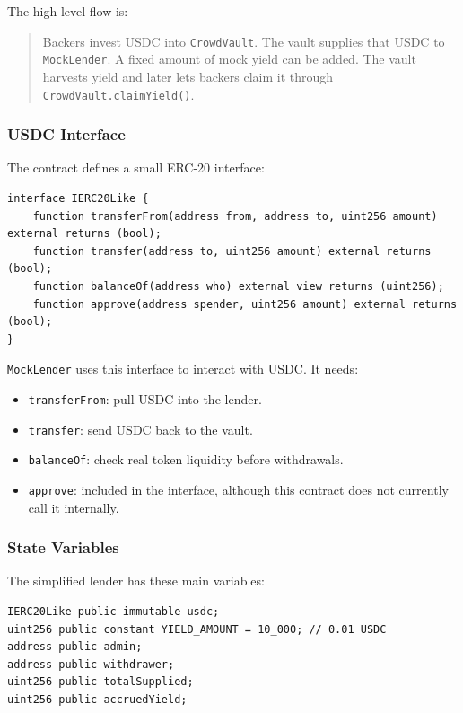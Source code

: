 \documentclass[11pt,a4paper]{article}
\begin{document}
The high-level flow is:

\begin{quote}
Backers invest USDC into \texttt{CrowdVault}. The vault supplies that USDC to \texttt{MockLender}. A fixed amount of mock yield can be added. The vault harvests yield and later lets backers claim it through \texttt{CrowdVault.claimYield()}.
\end{quote}

\subsubsection{USDC Interface}

The contract defines a small ERC-20 interface:

\begin{lstlisting}
interface IERC20Like {
    function transferFrom(address from, address to, uint256 amount) external returns (bool);
    function transfer(address to, uint256 amount) external returns (bool);
    function balanceOf(address who) external view returns (uint256);
    function approve(address spender, uint256 amount) external returns (bool);
}
\end{lstlisting}

\texttt{MockLender} uses this interface to interact with USDC. It needs:

\begin{itemize}
  \item \texttt{transferFrom}: pull USDC into the lender.
  \item \texttt{transfer}: send USDC back to the vault.
  \item \texttt{balanceOf}: check real token liquidity before withdrawals.
  \item \texttt{approve}: included in the interface, although this contract does not currently call it internally.
\end{itemize}

\subsubsection{State Variables}

The simplified lender has these main variables:

\begin{lstlisting}
IERC20Like public immutable usdc;
uint256 public constant YIELD_AMOUNT = 10_000; // 0.01 USDC
address public admin;
address public withdrawer;
uint256 public totalSupplied;
uint256 public accruedYield;
\end{lstlisting}
\end{document}
